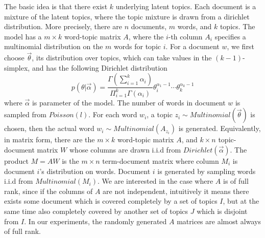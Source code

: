 \documentclass{article}
\begin{document}
The basic idea is that there exist $k$ underlying latent topics. Each document is a mixture of the latent topics, where the topic mixture is drawn from a dirichlet distribution. More precisely, there are $n$ documents, $m$ words, and $k$ topics. The model has a $m\times k$ word-topic matrix $A$, where the $i$-th column $A_i$ specifies a multinomial distribution on the $m$ words for topic $i$. For a document $w$, we first choose $\vec{\theta}$, its distribution over topics, which can take values in the $(k-1)$-simplex, and has the following Dirichlet distribution
\[
p(\theta|\vec{\alpha})=\frac{\Gamma(\sum_{i=1}^k\alpha_i)}{\Pi_{i=1}^k\Gamma(\alpha_i)}\theta_i^{\alpha_1-1}\cdots\theta_k^{\alpha_k-1}
\] 
where $\vec{\alpha}$ is parameter of the model. The number of words in document $w$ is sampled from $Poisson(l)$. For each word $w_i$, a topic $z_i\sim Multinomial(\vec{\theta})$ is chosen, then the actual word $w_i\sim Multinomial(A_{z_i})$ is generated. Equivalently, in matrix form, there are the $m\times k$ word-topic matrix $A$, and $k\times n$ topic-document matrix $W$ whose columns are drawn i.i.d from $Dirichlet(\vec{\alpha})$. The product $M=AW$ is the $m\times n$ term-document matrix where column $M_i$ is document $i$'s distribution on words. Document $i$ is generated by sampling words i.i.d from $Multinomial(M_i)$. We are interested in the case where $A$ is of full rank, since if the columns of $A$ are not independent, intuitively it means there exists some document which is covered completely by a set of topics $I$, but at the same time also completely covered by another set of topics $J$ which is disjoint from $I$. In our experiments, the randomly generated $A$ matrices are almost always of full rank. 
\end{document}
